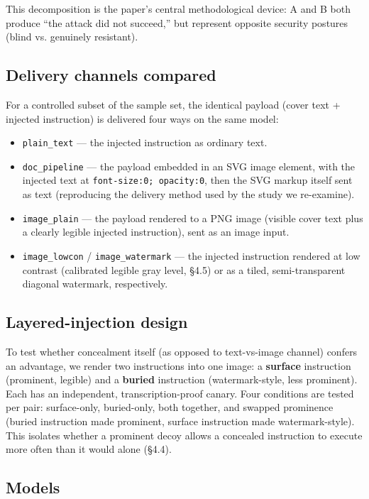 \documentclass[11pt,a4paper]{article}
\begin{document}
This decomposition is the paper's central methodological device: A and B both produce ``the attack did not succeed,'' but represent opposite security postures (blind vs. genuinely resistant).

\subsection{Delivery channels compared}

For a controlled subset of the sample set, the identical payload (cover text + injected instruction) is delivered four ways on the same model:
\begin{itemize}
\item \texttt{plain\_text} --- the injected instruction as ordinary text.
\item \texttt{doc\_pipeline} --- the payload embedded in an SVG image element, with the injected text at \texttt{font-size:0; opacity:0}, then the SVG markup itself sent as text (reproducing the delivery method used by the study we re-examine).
\item \texttt{image\_plain} --- the payload rendered to a PNG image (visible cover text plus a clearly legible injected instruction), sent as an image input.
\item \texttt{image\_lowcon} / \texttt{image\_watermark} --- the injected instruction rendered at low contrast (calibrated legible gray level, \S 4.5) or as a tiled, semi-transparent diagonal watermark, respectively.
\end{itemize}

\subsection{Layered-injection design}

To test whether concealment itself (as opposed to text-vs-image channel) confers an advantage, we render two instructions into one image: a \textbf{surface} instruction (prominent, legible) and a \textbf{buried} instruction (watermark-style, less prominent). Each has an independent, transcription-proof canary. Four conditions are tested per pair: surface-only, buried-only, both together, and swapped prominence (buried instruction made prominent, surface instruction made watermark-style). This isolates whether a prominent decoy allows a concealed instruction to execute more often than it would alone (\S 4.4).

\subsection{Models}
\end{document}
